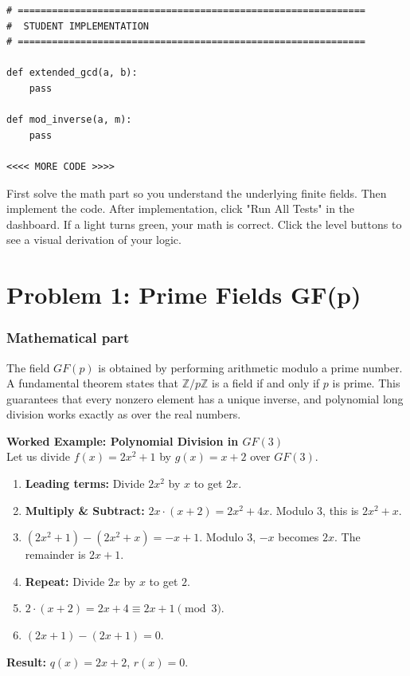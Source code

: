 \documentclass[11pt]{article}
\begin{document}
\begin{lstlisting}
# =============================================================
#  STUDENT IMPLEMENTATION
# =============================================================

def extended_gcd(a, b):
    pass

def mod_inverse(a, m):
    pass

<<<< MORE CODE >>>>
\end{lstlisting}

First solve the math part so you understand the underlying finite fields. Then implement the code. After implementation, click "Run All Tests" in the dashboard. If a light turns green, your math is correct. Click the level buttons to see a visual derivation of your logic.


\section*{Problem 1: Prime Fields GF(p)}

\subsubsection*{Mathematical part}
The field $GF(p)$ is obtained by performing arithmetic modulo a prime number. A fundamental theorem states that $\mathbb Z/p\mathbb Z$ is a field if and only if $p$ is prime. This guarantees that every nonzero element has a unique inverse, and polynomial long division works exactly as over the real numbers.

\textbf{Worked Example: Polynomial Division in $GF(3)$} \\
Let us divide $f(x) = 2x^2 + 1$ by $g(x) = x + 2$ over $GF(3)$.
\begin{enumerate}
    \item \textbf{Leading terms:} Divide $2x^2$ by $x$ to get $2x$.
    \item \textbf{Multiply \& Subtract:} $2x \cdot (x + 2) = 2x^2 + 4x$. Modulo 3, this is $2x^2 + x$.
    \item $(2x^2 + 1) - (2x^2 + x) = -x + 1$. Modulo 3, $-x$ becomes $2x$. The remainder is $2x + 1$.
    \item \textbf{Repeat:} Divide $2x$ by $x$ to get $2$.
    \item $2 \cdot (x + 2) = 2x + 4 \equiv 2x + 1 \pmod 3$.
    \item $(2x + 1) - (2x + 1) = 0$.
\end{enumerate}
\textbf{Result:} $q(x) = 2x + 2$, $r(x) = 0$.
\end{document}
